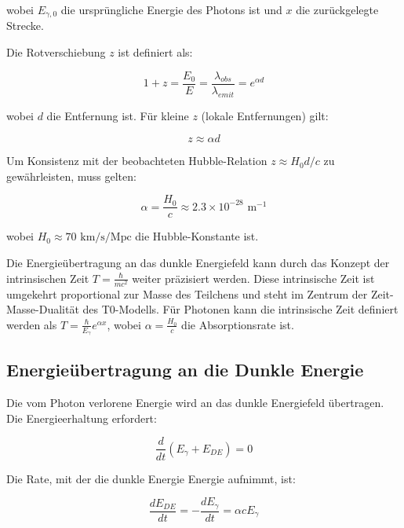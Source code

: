 \documentclass[a4paper,12pt]{article}
\begin{document}
wobei $E_{\gamma,0}$ die ursprüngliche Energie des Photons ist und $x$ die zurückgelegte Strecke.

Die Rotverschiebung $z$ ist definiert als:

\begin{equation}
	1 + z = \frac{E_0}{E} = \frac{\lambda_{obs}}{\lambda_{emit}} = e^{\alpha d}
\end{equation}

wobei $d$ die Entfernung ist. Für kleine $z$ (lokale Entfernungen) gilt:

\begin{equation}
	z \approx \alpha d
\end{equation}

Um Konsistenz mit der beobachteten Hubble-Relation $z \approx H_0 d/c$ zu gewährleisten, muss gelten:

\begin{equation}
	\alpha = \frac{H_0}{c} \approx 2.3 \times 10^{-28} \text{ m}^{-1}
\end{equation}

wobei $H_0 \approx 70 \text{ km/s/Mpc}$ die Hubble-Konstante ist.

Die Energieübertragung an das dunkle Energiefeld kann durch das Konzept der intrinsischen Zeit $T = \frac{\hbar}{mc^2}$ weiter präzisiert werden. Diese intrinsische Zeit ist umgekehrt proportional zur Masse des Teilchens und steht im Zentrum der Zeit-Masse-Dualität des T0-Modells. Für Photonen kann die intrinsische Zeit definiert werden als $T = \frac{\hbar}{E_{\gamma}} e^{\alpha x}$, wobei $\alpha = \frac{H_0}{c}$ die Absorptionsrate ist.

\subsection{Energieübertragung an die Dunkle Energie}

Die vom Photon verlorene Energie wird an das dunkle Energiefeld übertragen. Die Energieerhaltung erfordert:

\begin{equation}
	\frac{d}{dt}(E_{\gamma} + E_{DE}) = 0
\end{equation}

Die Rate, mit der die dunkle Energie Energie aufnimmt, ist:

\begin{equation}
	\frac{dE_{DE}}{dt} = -\frac{dE_{\gamma}}{dt} = \alpha c E_{\gamma}
\end{equation}
\end{document}
